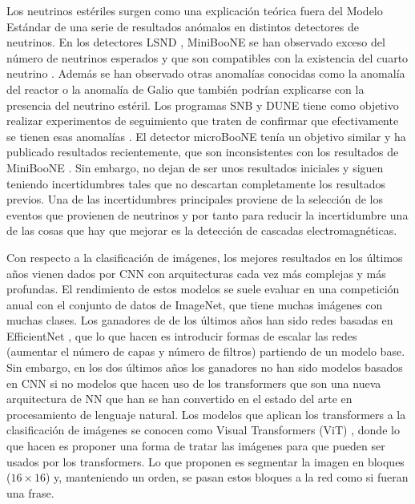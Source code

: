 \documentclass[a4paper,12pt,twoside,titlepage]{article}
\begin{document}
Los neutrinos estériles surgen como una explicación teórica fuera del Modelo Estándar de una serie de resultados anómalos en distintos detectores de neutrinos. En los detectores LSND \cite{lsnd}, MiniBooNE \cite{miniboo} se han observado exceso del número de neutrinos esperados y que son compatibles con la existencia del cuarto neutrino \cite{sbnd}. Además se han observado otras anomalías conocidas como la anomalía del reactor o la anomalía de Galio que también podrían explicarse con la presencia del neutrino estéril. Los programas SNB y DUNE tiene como objetivo realizar experimentos de seguimiento que traten de confirmar que efectivamente se tienen esas anomalías \cite{sbnd, dune}. El detector microBooNE \cite{microboo} tenía un objetivo similar y ha publicado resultados recientemente, que son inconsistentes con los resultados de MiniBooNE  \cite{micro_res}. Sin embargo, no dejan de ser unos resultados iniciales y siguen teniendo incertidumbres tales que no descartan completamente los resultados previos. Una de las incertidumbres principales proviene de la selección de los eventos que provienen de neutrinos y por tanto para reducir la incertidumbre una de las cosas que hay que mejorar es la detección de cascadas electromagnéticas. 

Con respecto a la clasificación de imágenes, los mejores resultados en los últimos años vienen dados por CNN con arquitecturas cada vez más complejas y más profundas. El rendimiento de estos modelos se suele evaluar en una competición anual con el conjunto de datos de ImageNet, que tiene muchas imágenes con muchas clases. Los ganadores de de los últimos años han sido redes basadas en EfficientNet \cite{efficientnet}, que lo que hacen es introducir formas de escalar las redes (aumentar el número de capas y número de filtros) partiendo de un modelo base. Sin embargo, en los dos últimos años los ganadores no han sido modelos basados en CNN si no modelos que hacen uso de los transformers \cite{transformers} que son una nueva arquitectura de NN que han se han convertido en el estado del arte en procesamiento de lenguaje natural. Los modelos que aplican los transformers a la clasificación de imágenes se conocen como Visual Transformers (ViT) \cite{vit}, donde lo que hacen es proponer una forma de tratar las imágenes para que pueden ser usados por los transformers. Lo que proponen es segmentar la imagen en bloques ($16\times 16$) y, manteniendo un orden, se pasan estos bloques a la red como si fueran una frase.
\end{document}
